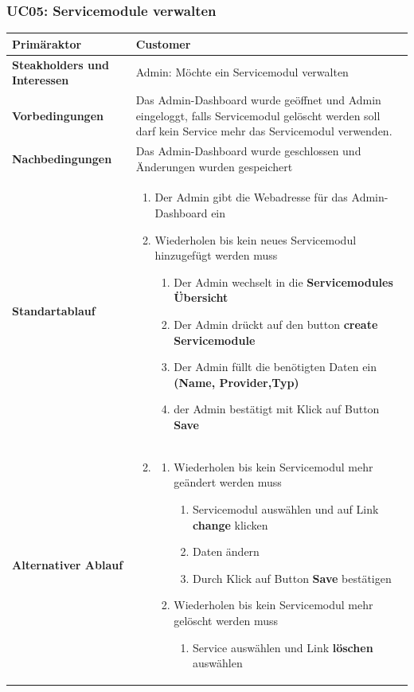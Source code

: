 \documentclass[11pt]{scrartcl}
\begin{document}
\subsubsection{UC05: Servicemodule verwalten}
\begin{longtabu} to \textwidth {X[1,l] X[2,l]}
	\bfseries Primäraktor & Customer  \\\hline 
	\bfseries Steakholders und Interessen & Admin: Möchte ein Servicemodul verwalten  \\\hline 
	\bfseries Vorbedingungen & Das Admin-Dashboard wurde geöffnet und Admin eingeloggt, 
	falls Servicemodul gelöscht werden soll darf kein Service mehr das Servicemodul verwenden. \\\hline 
	\bfseries Nachbedingungen & Das Admin-Dashboard wurde geschlossen und 
	Änderungen wurden gespeichert \\\hline 
	\bfseries Standartablauf & 
	\begin{enumerate}
			\item Der Admin gibt die Webadresse für das Admin-Dashboard ein
			\item Wiederholen bis kein neues Servicemodul hinzugefügt werden muss
			\begin{enumerate}
			  \item Der Admin wechselt in die \textbf{Servicemodules Übersicht}
			  \item Der Admin drückt auf den button \textbf{create Servicemodule}
			  \item Der Admin füllt die benötigten Daten ein \textbf{(Name, Provider,Typ)}
			  \item der Admin bestätigt mit Klick auf Button \textbf{Save}
			\end{enumerate}
		\end{enumerate}
      \\\hline
      \bfseries Alternativer Ablauf & 
      \begin{enumerate}
        \setcounter{enumi}{1}
        \item 
        \begin{enumerate}
          \item Wiederholen bis kein Servicemodul mehr geändert werden muss
            \begin{enumerate}
              \item Servicemodul auswählen und auf Link \textbf{change} klicken
              \item Daten ändern
              \item Durch Klick auf Button \textbf{Save} bestätigen
            \end{enumerate}
            \item Wiederholen bis kein Servicemodul mehr gelöscht werden muss
            \begin{enumerate}
              \item Service auswählen und Link \textbf{löschen} auswählen
            \end{enumerate}
        \end{enumerate}
      \end{enumerate}
      \\\hline


\end{longtabu}
\end{document}
